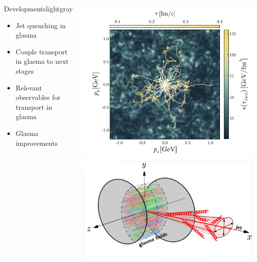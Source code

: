 \documentclass[aspectratio=169,11pt,usenames,dvipsnames]{beamer}
\begin{document}
\begin{frame}
\begin{center}
\begin{columns}
\begin{center}
\begin{custombox2}{{\color{jyured}\large Developments}}{lightgray}
\begin{varwidth}{0.78\textwidth}
\begin{itemize}
                        \item Jet quenching in glasma
                        \item Couple transport in glasma to next stages
                        \item Relevant observables for transport in glasma
                        \item Glasma improvements
                    \end{itemize}
                    \end{varwidth}
                \end{custombox2}
            \end{center}
                \begin{center}\includegraphics[width=0.9\columnwidth]{images/hqs_trajectories.png}\\[5pt]
                    \includegraphics[width=\columnwidth]{images/momentum_broadening_flipped_jetquenched_notext.pdf}\end{center}
        \end{columns}
    \end{center}


\end{frame}
\end{document}
